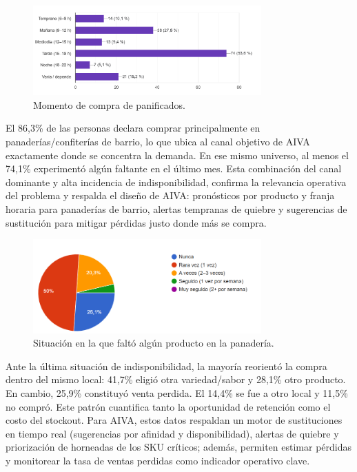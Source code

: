 \begin{figure}[t]
    \centering
    \includegraphics[width=0.78\textwidth]{images/MomentoDeCompra.png}
    \caption{Momento de compra de panificados.}
    \label{fig:momento-compra}
\end{figure}


El 86,3\% de las personas declara comprar principalmente en panaderías/confiterías de barrio, lo que ubica al canal objetivo de AIVA exactamente donde se concentra la demanda. En ese mismo universo, al menos el 74,1\% experimentó algún faltante en el último mes. Esta combinación del canal dominante y alta incidencia de indisponibilidad, confirma la relevancia operativa del problema y respalda el diseño de AIVA: pronósticos por producto y franja horaria para panaderías de barrio, alertas tempranas de quiebre y sugerencias de sustitución para mitigar pérdidas justo donde más se compra.

\begin{figure}[t]
    \centering
    \includegraphics[width=0.78\textwidth]{images/NoHubieraProducto.png}
    \caption{Situación en la que faltó algún producto en la panadería.}
    \label{fig:no-hubiera-producto}
\end{figure}


Ante la última situación de indisponibilidad, la mayoría reorientó la compra dentro del mismo local: 41,7\% eligió otra variedad/sabor y 28,1\% otro producto. En cambio, 25,9\% constituyó venta perdida. El 14,4\% se fue a otro local y 11,5\% no compró. Este patrón cuantifica tanto la oportunidad de retención como el costo del stockout. Para AIVA, estos datos respaldan un motor de sustituciones en tiempo real (sugerencias por afinidad y disponibilidad), alertas de quiebre y priorización de horneadas de los SKU críticos; además, permiten estimar pérdidas y monitorear la tasa de ventas perdidas como indicador operativo clave.


